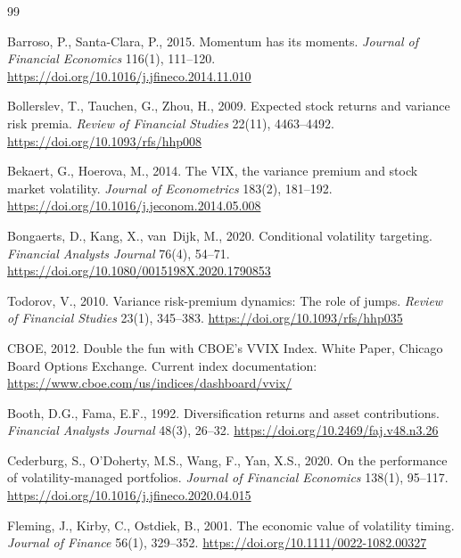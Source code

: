 \documentclass[12pt,a4paper]{article}
\begin{document}

\begin{thebibliography}{99}

Barroso, P., Santa-Clara, P., 2015. Momentum has its moments. \textit{Journal of Financial Economics} 116(1), 111--120. \url{https://doi.org/10.1016/j.jfineco.2014.11.010}

Bollerslev, T., Tauchen, G., Zhou, H., 2009. Expected stock returns and variance risk premia. \textit{Review of Financial Studies} 22(11), 4463--4492. \url{https://doi.org/10.1093/rfs/hhp008}

Bekaert, G., Hoerova, M., 2014. The VIX, the variance premium and stock market volatility. \textit{Journal of Econometrics} 183(2), 181--192. \url{https://doi.org/10.1016/j.jeconom.2014.05.008}

Bongaerts, D., Kang, X., van~Dijk, M., 2020. Conditional volatility targeting. \textit{Financial Analysts Journal} 76(4), 54--71. \url{https://doi.org/10.1080/0015198X.2020.1790853}

Todorov, V., 2010. Variance risk-premium dynamics: The role of jumps. \textit{Review of Financial Studies} 23(1), 345--383. \url{https://doi.org/10.1093/rfs/hhp035}

CBOE, 2012. Double the fun with CBOE's VVIX Index. White Paper, Chicago Board Options Exchange. Current index documentation: \url{https://www.cboe.com/us/indices/dashboard/vvix/}

Booth, D.G., Fama, E.F., 1992. Diversification returns and asset contributions. \textit{Financial Analysts Journal} 48(3), 26--32. \url{https://doi.org/10.2469/faj.v48.n3.26}

Cederburg, S., O'Doherty, M.S., Wang, F., Yan, X.S., 2020. On the performance of volatility-managed portfolios. \textit{Journal of Financial Economics} 138(1), 95--117. \url{https://doi.org/10.1016/j.jfineco.2020.04.015}

Fleming, J., Kirby, C., Ostdiek, B., 2001. The economic value of volatility timing. \textit{Journal of Finance} 56(1), 329--352. \url{https://doi.org/10.1111/0022-1082.00327}


\end{thebibliography}
\end{document}
